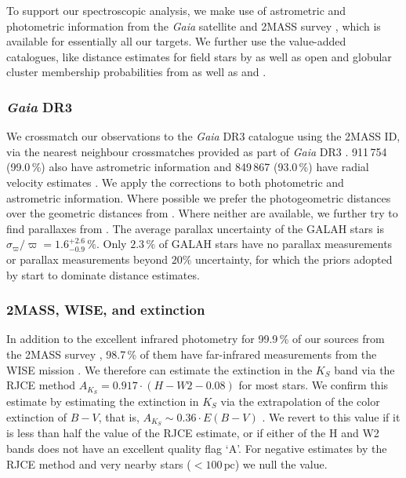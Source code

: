 \documentclass[
  journal=pasa,
  manuscript=research-paper, %
  year=2024,
  volume=37
]{cup-journal}
\newcommand{\Gaia}{\textit{Gaia}\xspace}
\begin{document}
To support our spectroscopic analysis, we make use of astrometric and photometric information from the \Gaia satellite \citep{Gaia-Collaboration2016} and 2MASS survey \citep{Skrutskie2006}, which is available for essentially all our targets. We further use the value-added catalogues, like distance estimates for field stars by \citep{BailerJones2021} as well as open and globular cluster membership probabilities from \citet{CantatGaudin2020} as well as \citet{Vasiliev2021} and \citet{Baumgardt2021}.

\subsubsection{\Gaia DR3}

We crossmatch our observations to the \Gaia DR3 catalogue \citep{Brown2021,GaiaDR3} using the 2MASS ID, via the nearest neighbour crossmatches provided as part of \Gaia DR3 \citep{Torra2021}. 
911\,754 (99.0\,\%) also have astrometric information \citep{Lindegren2021a} and 849\,867 (93.0\,\%) have radial velocity estimates \citep{Katz2023}. We apply the corrections to both photometric \citep{Riello2021} and astrometric \citep{Lindegren2021b} information. Where possible we prefer the photogeometric distances over the geometric distances from \citep{BailerJones2021}. Where neither are available, we further try to find parallaxes from \cite{vanLeeuwen2007}. The average parallax uncertainty of the GALAH stars is $\sigma_{\varpi} / \varpi = 1.6_{-0.9}^{+2.6}\,\mathrm{\%}$. Only $2.3\,\%$ of GALAH stars have no parallax measurements or parallax measurements beyond $20\%$ uncertainty, for which the priors adopted by \citep{BailerJones2021} start to dominate distance estimates.

\subsubsection{2MASS, WISE, and extinction}

In addition to the excellent infrared photometry for 99.9\,\% of our sources from the 2MASS survey \citep{Skrutskie2006}, 98.7\,\% of them have far-infrared measurements from the WISE mission \citep{Cutri2013}. We therefore can estimate the extinction in the $K_S$ band via the RJCE method \citep{Majewski2011} $A_{K_S}  = 0.917 \cdot \left( H - W2 - 0.08 \right)$ for most stars. We confirm this estimate by estimating the extinction in $K_S$ via the extrapolation of the color extinction of $B-V$, that is, $A_{K_S} \sim 0.36 \cdot E(B-V)$ \citep{Cardelli1989}. We revert to this value if it is less than half the value of the RJCE estimate, or if either of the H and W2 bands does not have an excellent quality flag `A'. For negative estimates by the RJCE method and very nearby stars ($<100\,\mathrm{pc}$) we null the value.
\end{document}
